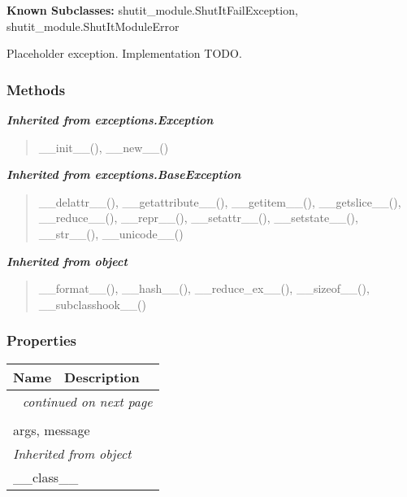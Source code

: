 \textbf{Known Subclasses:}
shutit\_module.ShutItFailException,
    shutit\_module.ShutItModuleError

Placeholder exception. Implementation TODO.



  \subsubsection{Methods}


\large{\textbf{\textit{Inherited from exceptions.Exception}}}

\begin{quote}
\_\_init\_\_(), \_\_new\_\_()
\end{quote}

\large{\textbf{\textit{Inherited from exceptions.BaseException}}}

\begin{quote}
\_\_delattr\_\_(), \_\_getattribute\_\_(), \_\_getitem\_\_(), \_\_getslice\_\_(), \_\_reduce\_\_(), \_\_repr\_\_(), \_\_setattr\_\_(), \_\_setstate\_\_(), \_\_str\_\_(), \_\_unicode\_\_()
\end{quote}

\large{\textbf{\textit{Inherited from object}}}

\begin{quote}
\_\_format\_\_(), \_\_hash\_\_(), \_\_reduce\_ex\_\_(), \_\_sizeof\_\_(), \_\_subclasshook\_\_()
\end{quote}


  \subsubsection{Properties}

    \vspace{-1cm}
\hspace{\varindent}\begin{longtable}{|p{\varnamewidth}|p{\vardescrwidth}|l}
\cline{1-2}
\cline{1-2} \centering \textbf{Name} & \centering \textbf{Description}& \\
\cline{1-2}
\endhead\cline{1-2}\multicolumn{3}{r}{\small\textit{continued on next page}}\\\endfoot\cline{1-2}
\endlastfoot\multicolumn{2}{|l|}{\textit{Inherited from exceptions.BaseException}}\\
\multicolumn{2}{|p{\varwidth}|}{\raggedright args, message}\\
\cline{1-2}
\multicolumn{2}{|l|}{\textit{Inherited from object}}\\
\multicolumn{2}{|p{\varwidth}|}{\raggedright \_\_class\_\_}\\
\cline{1-2}
\end{longtable}

